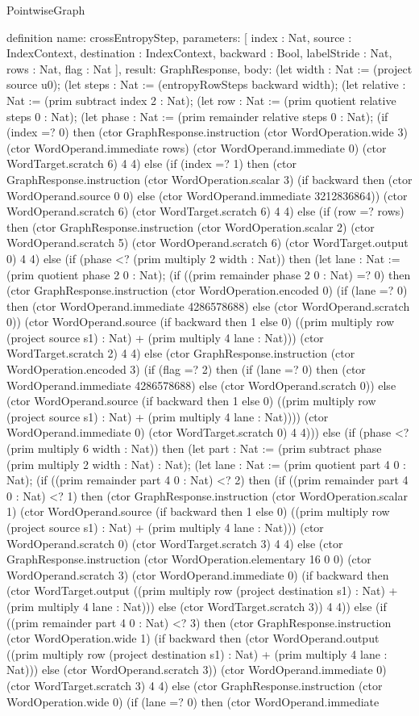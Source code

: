 \begin{lexlean}{PointwiseGraph}
\begin{semanticmodule}
definition{
  name: crossEntropyStep,
  parameters: [
    index : Nat,
    source : IndexContext,
    destination : IndexContext,
    backward : Bool,
    labelStride : Nat,
    rows : Nat,
    flag : Nat
  ],
  result: GraphResponse,
  body: (let width : Nat := (project source u0); (let steps : Nat := (entropyRowSteps backward width); (let relative : Nat := (prim subtract index 2 : Nat); (let row : Nat := (prim quotient relative steps 0 : Nat); (let phase : Nat := (prim remainder relative steps 0 : Nat); (if (index =? 0) then (ctor GraphResponse.instruction (ctor WordOperation.wide 3) (ctor WordOperand.immediate rows) (ctor WordOperand.immediate 0) (ctor WordTarget.scratch 6) 4 4) else (if (index =? 1) then (ctor GraphResponse.instruction (ctor WordOperation.scalar 3) (if backward then (ctor WordOperand.source 0 0) else (ctor WordOperand.immediate 3212836864)) (ctor WordOperand.scratch 6) (ctor WordTarget.scratch 6) 4 4) else (if (row =? rows) then (ctor GraphResponse.instruction (ctor WordOperation.scalar 2) (ctor WordOperand.scratch 5) (ctor WordOperand.scratch 6) (ctor WordTarget.output 0) 4 4) else (if (phase <? (prim multiply 2 width : Nat)) then (let lane : Nat := (prim quotient phase 2 0 : Nat); (if ((prim remainder phase 2 0 : Nat) =? 0) then (ctor GraphResponse.instruction (ctor WordOperation.encoded 0) (if (lane =? 0) then (ctor WordOperand.immediate 4286578688) else (ctor WordOperand.scratch 0)) (ctor WordOperand.source (if backward then 1 else 0) ((prim multiply row (project source s1) : Nat) + (prim multiply 4 lane : Nat))) (ctor WordTarget.scratch 2) 4 4) else (ctor GraphResponse.instruction (ctor WordOperation.encoded 3) (if (flag =? 2) then (if (lane =? 0) then (ctor WordOperand.immediate 4286578688) else (ctor WordOperand.scratch 0)) else (ctor WordOperand.source (if backward then 1 else 0) ((prim multiply row (project source s1) : Nat) + (prim multiply 4 lane : Nat)))) (ctor WordOperand.immediate 0) (ctor WordTarget.scratch 0) 4 4))) else (if (phase <? (prim multiply 6 width : Nat)) then (let part : Nat := (prim subtract phase (prim multiply 2 width : Nat) : Nat); (let lane : Nat := (prim quotient part 4 0 : Nat); (if ((prim remainder part 4 0 : Nat) <? 2) then (if ((prim remainder part 4 0 : Nat) <? 1) then (ctor GraphResponse.instruction (ctor WordOperation.scalar 1) (ctor WordOperand.source (if backward then 1 else 0) ((prim multiply row (project source s1) : Nat) + (prim multiply 4 lane : Nat))) (ctor WordOperand.scratch 0) (ctor WordTarget.scratch 3) 4 4) else (ctor GraphResponse.instruction (ctor WordOperation.elementary 16 0 0) (ctor WordOperand.scratch 3) (ctor WordOperand.immediate 0) (if backward then (ctor WordTarget.output ((prim multiply row (project destination s1) : Nat) + (prim multiply 4 lane : Nat))) else (ctor WordTarget.scratch 3)) 4 4)) else (if ((prim remainder part 4 0 : Nat) <? 3) then (ctor GraphResponse.instruction (ctor WordOperation.wide 1) (if backward then (ctor WordOperand.output ((prim multiply row (project destination s1) : Nat) + (prim multiply 4 lane : Nat))) else (ctor WordOperand.scratch 3)) (ctor WordOperand.immediate 0) (ctor WordTarget.scratch 3) 4 4) else (ctor GraphResponse.instruction (ctor WordOperation.wide 0) (if (lane =? 0) then (ctor WordOperand.immediate }
\end{semanticmodule}
\end{lexlean}
